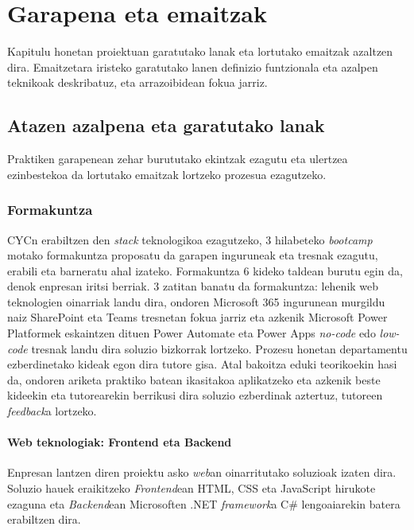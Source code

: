 \chapter{Garapena eta emaitzak}


     Kapitulu honetan proiektuan garatutako lanak eta lortutako emaitzak azaltzen dira. Emaitzetara iristeko garatutako lanen definizio funtzionala eta azalpen teknikoak deskribatuz, eta arrazoibidean fokua jarriz.



\section{Atazen azalpena eta garatutako lanak}
Praktiken garapenean zehar burututako ekintzak ezagutu eta ulertzea ezinbestekoa da lortutako emaitzak lortzeko prozesua ezagutzeko. 
\subsection{Formakuntza}\label{sec:bootcamp}
CYCn erabiltzen den \textit{stack} teknologikoa ezagutzeko, 3 hilabeteko \textit{bootcamp} motako formakuntza proposatu da
garapen inguruneak eta tresnak ezagutu, erabili eta barneratu ahal izateko. Formakuntza 6
kideko taldean burutu egin da, denok enpresan iritsi berriak. 3 zatitan banatu da formakuntza:
lehenik web teknologien oinarriak landu dira, ondoren Microsoft 365 ingurunean murgildu naiz
SharePoint eta Teams tresnetan fokua jarriz eta azkenik Microsoft Power Platformek
eskaintzen dituen Power Automate eta Power Apps \textit{no-code} edo \textit{low-code} tresnak landu dira soluzio
bizkorrak lortzeko. Prozesu honetan departamentu ezberdinetako kideak egon dira tutore
gisa. Atal bakoitza eduki teorikoekin hasi da, ondoren ariketa praktiko batean ikasitakoa
aplikatzeko eta azkenik beste kideekin eta tutorearekin berrikusi dira soluzio ezberdinak
aztertuz, tutoreen \textit{feedback}a lortzeko. 

\subsubsection{Web teknologiak: Frontend eta Backend}
Enpresan lantzen diren proiektu asko \textit{web}an oinarritutako soluzioak izaten dira. Soluzio
hauek eraikitzeko \textit{Frontend}ean HTML, CSS eta JavaScript hirukote ezaguna eta \textit{Backend}ean
Microsoften .NET \textit{framework}a C\# lengoaiarekin batera erabiltzen dira.

